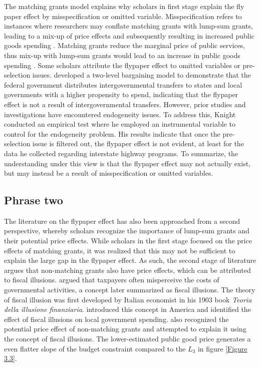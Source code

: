 The matching grants model explains why scholars in first stage explain the fly paper effect by misspecification or omitted variable. Misspecification refers to instances where researchers may conflate matching grants with lump-sum grants, leading to a mix-up of price effects and subsequently resulting in increased public goods spending \parencite{lankford1987note,henderson1968local}. Matching grants reduce the marginal price of public services, thus mix-up with lump-sum grants would lead to an increase in public goods spending \parencite{gramlich1997state}. Some scholars attribute the flypaper effect to omitted variables or pre-selection issues. \textcite{knight2002endogenous} developed a two-level bargaining model to demonstrate that the federal government distributes intergovernmental transfers to states and local governments with a higher propensity to spend, indicating that the flypaper effect is not a result of intergovernmental transfers. However, prior studies and investigations have encountered endogeneity issues. To address this, Knight conducted an empirical test where he employed an instrumental variable to control for the endogeneity problem. His results indicate that once the pre-selection issue is filtered out, the flypaper effect is not evident, at least for the data he collected regarding interstate highway programs. To summarize, the understanding under this view is that the flypaper effect may not actually exist, but may instead be a result of misspecification or omitted variables.

\subsection{Phrase two}

The literature on the flypaper effect has also been approached from a second perspective, whereby scholars recognize the importance of lump-sum grants and their potential price effects. While scholars in the first stage focused on the price effects of matching grants, it was realized that this may not be sufficient to explain the large gap in the flypaper effect. As such, the second stage of literature argues that non-matching grants also have price effects, which can be attributed to fiscal illusions. \textcite{mcculloch1845treatise} argued that taxpayers often misperceive the costs of governmental activities, a concept later summarized as fiscal illusions. The theory of fiscal illusion was first developed by Italian economist \textcite{puviani1903teoria}in his 1903 book \textit{Teoria della illusione finanziaria}. \textcite{wagner1976revenue} introduced this concept in America and identified the effect of fiscal illusions on local government spending. \textcite{oates1979lump,borge1995lump} also recognized the potential price effect of non-matching grants and attempted to explain it using the concept of fiscal illusions. The lower-estimated public good price generates a even flatter slope of the budget constraint compared to the $L_3$ in figure \ref{Figure 3.3}.

